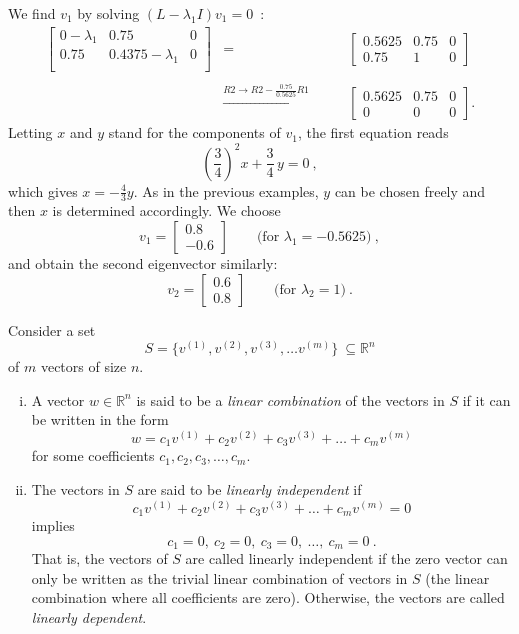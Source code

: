 \begin{example}
\begin{enumerate}[(i)]
		We find $v_1$ by solving $(L-\lambda_1 I)v_1=0$~:
		\[\begin{array}{ccc}
		\left[\begin{array}{cc|c}
		0-\lambda_1 & 0.75 & 0 \\
		0.75  & 0.4375 - \lambda_1& 0 \\
		\end{array}\right] & = \qquad & \left[\begin{array}{cc|c}
		0.5625 & 0.75 & 0 \\
		0.75  & 1 & 0 
		\end{array}\right] \\ & & \\
		& \stackrel{R2 \rightarrow R2 - \frac{0.75}{0.5625} R1}{\rightarrow} \qquad & 
		\left[\begin{array}{cc|c}
		0.5625 & 0.75 & 0 \\
		0 &  0 & 0 
		\end{array}\right].
		\end{array}	\]
		Letting $x$ and $y$ stand for the components of $v_1$, the first equation reads
		\[ \left(\frac34\right)^2 x + \frac34 \, y = 0 \:, \]
		which gives $x = - \tfrac43 y$. As in the previous examples, $y$ can be chosen freely  and then $x$ is determined accordingly. We choose
		\[v_1 = \begin{bmatrix}
		0.8 \\ -0.6
		\end{bmatrix} \qquad \text{(for $\lambda_1 = -0.5625$)} \:, \]
		and obtain the second eigenvector similarly:
		\[v_2 = \begin{bmatrix}
		0.6 \\ 0.8
		\end{bmatrix} \qquad \text{(for $\lambda_2 = 1$)} \:. \]
	\end{enumerate}
\end{example}

\begin{definition}
\label{def:li}
Consider a set 
\[ S = \{ v^{(1)},v^{(2)},v^{(3)}, \dots v^{(m)}\} \: \subseteq\mathbb{R}^n \]
of $m$ vectors of size $n$.
\begin{enumerate}[(i)]
\item A vector $w \in \mathbb{R}^n$ is said to be a \emph{linear combination} of the vectors in $S$ if it can be written in the form
\[ w = c_1v^{(1)}+c_2v^{(2)}+c_3v^{(3)} + \dots + c_mv^{(m)} \]
for some coefficients $c_1,c_2,c_3,\dots,c_m$.
\item The vectors in $S$ are said to be \emph{linearly independent} if 
\[ c_1v^{(1)}+c_2v^{(2)}+c_3v^{(3)} + \dots + c_mv^{(m)} = 0 \]
implies
\[ c_1=0,\:c_2=0,\:c_3=0,\:\dots,\:c_m=0 \:. \]
That is, the vectors of $S$ are called linearly independent if the zero vector can only be written as the trivial linear combination of vectors in $S$ (the linear combination where all coefficients are zero). Otherwise, the vectors are called \emph{linearly dependent}.
\end{enumerate}
\end{definition}

